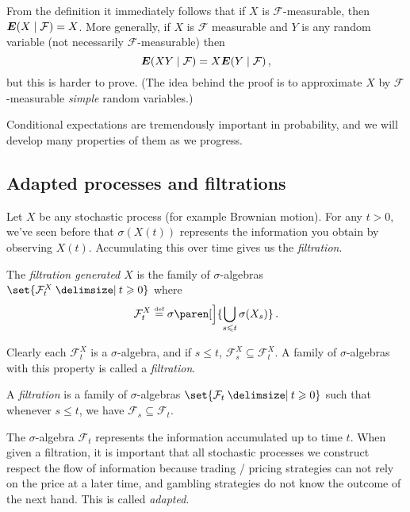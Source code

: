 \begin{remark}
  From the definition it immediately follows that if $X$ is $\mathcal F$-measurable, then $\E(X \given \mathcal F) = X$.
  More generally, if $X$ is $\mathcal F$ measurable and $Y$ is any random variable (not necessarily $\mathcal F$-measurable) then
  \begin{equation*}
    \E( XY \given \mathcal F) = X \E( Y \given \mathcal F ) \,,
  \end{equation*}
  but this is harder to prove.
  (The idea behind the proof is to approximate $X$ by $\mathcal F$-measurable \emph{simple} random variables.)
\end{remark}

Conditional expectations are tremendously important in probability, and we will develop many properties of them as we progress.

\subsection{Adapted processes and filtrations}

Let $X$ be any stochastic process (for example Brownian motion).
For any $t > 0$, we've seen before that $\sigma(X(t))$ represents the information you obtain by observing $X(t)$.
Accumulating this over time gives us the \emph{filtration}.

\begin{definition}
  The \emph{filtration generated $X$} is the family of $\sigma$-algebras $\set{\mathcal F^X_t \st t \geq 0}$ where
  \begin{equation*}
    \mathcal F_t^X \defeq \sigma\paren[\Big]{ \bigcup_{s \leq t} \sigma(X_s) }
    \,.
  \end{equation*}
\end{definition}

Clearly each $\mathcal F_t^X$ is a $\sigma$-algebra, and if $s \leq t$, $\mathcal F^X_s \subseteq \mathcal F^X_t$.
A family of $\sigma$-algebras with this property is called a \emph{filtration}.

\begin{definition}
  A \emph{filtration} is a family of $\sigma$-algebras $\set{ \mathcal F_t \st t \geq 0}$ such that whenever $s \leq t$, we have $\mathcal F_s \subseteq \mathcal F_t$.
\end{definition}

The $\sigma$-algebra $\mathcal F_t$ represents the information accumulated up to time $t$.
When given a filtration, it is important that all stochastic processes we construct respect the flow of information because trading / pricing strategies can not rely on the price at a later time, and gambling strategies do not know the outcome of the next hand.
This is called \emph{adapted}.

